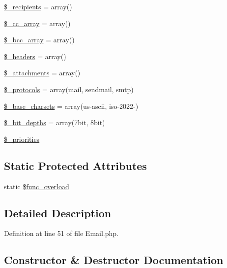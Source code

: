 \begin{DoxyCompactItemize}
\item 
\mbox{\hyperlink{class_c_i___email_aa5f5e78dd9477bdec18b4aadae77ba13}{\$\+\_\+recipients}} = array()
\item 
\mbox{\hyperlink{class_c_i___email_af979b4b8dc11cd847482938c13fd527d}{\$\+\_\+cc\+\_\+array}} = array()
\item 
\mbox{\hyperlink{class_c_i___email_a9e55a2ff848d216fa27361d3c66d979d}{\$\+\_\+bcc\+\_\+array}} = array()
\item 
\mbox{\hyperlink{class_c_i___email_a1481ae63a7fb295087c3a668a0359500}{\$\+\_\+headers}} = array()
\item 
\mbox{\hyperlink{class_c_i___email_a36f182452832f13cf40ab24ee9ffce90}{\$\+\_\+attachments}} = array()
\item 
\mbox{\hyperlink{class_c_i___email_a67dcd847790518bf5fbe6576a0c11c04}{\$\+\_\+protocols}} = array(\textquotesingle{}mail\textquotesingle{}, \textquotesingle{}sendmail\textquotesingle{}, \textquotesingle{}smtp\textquotesingle{})
\item 
\mbox{\hyperlink{class_c_i___email_a212a02e70f089ba2e1a29bd6f45b0691}{\$\+\_\+base\+\_\+charsets}} = array(\textquotesingle{}us-\/ascii\textquotesingle{}, \textquotesingle{}iso-\/2022-\/\textquotesingle{})
\item 
\mbox{\hyperlink{class_c_i___email_a65b779b2385490a293d286a135bdf00c}{\$\+\_\+bit\+\_\+depths}} = array(\textquotesingle{}7bit\textquotesingle{}, \textquotesingle{}8bit\textquotesingle{})
\item 
\mbox{\hyperlink{class_c_i___email_af2e56ba04b214aad41be6db88e729645}{\$\+\_\+priorities}}
\end{DoxyCompactItemize}
\subsection*{Static Protected Attributes}
\begin{DoxyCompactItemize}
\item 
static \mbox{\hyperlink{class_c_i___email_aef84be58d58a5895572c5689e56a1047}{\$func\+\_\+overload}}
\end{DoxyCompactItemize}


\subsection{Detailed Description}


Definition at line 51 of file Email.\+php.



\subsection{Constructor \& Destructor Documentation}
\mbox{\label{class_c_i___email_a35018c0dc92a448db5c4686364ced754}} 
